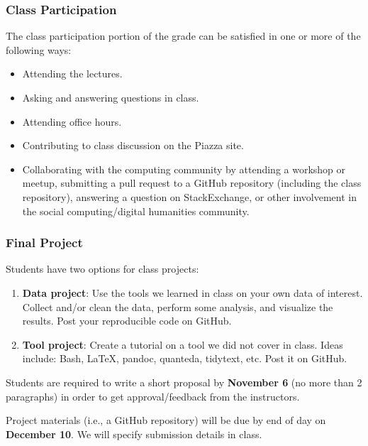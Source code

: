 \documentclass[]{book}
\providecommand{\tightlist}{%
  \setlength{\itemsep}{0pt}\setlength{\parskip}{0pt}}
\begin{document}
\subsubsection*{Class Participation}\label{class-participation}

The class participation portion of the grade can be satisfied in one or
more of the following ways:

\begin{itemize}
\tightlist
\item
  Attending the lectures.
\item
  Asking and answering questions in class.
\item
  Attending office hours.
\item
  Contributing to class discussion on the Piazza site.
\item
  Collaborating with the computing community by attending a workshop or
  meetup, submitting a pull request to a GitHub repository (including
  the class repository), answering a question on StackExchange, or other
  involvement in the social computing/digital humanities community.
\end{itemize}

\subsubsection*{Final Project}\label{final-project}

Students have two options for class projects:

\begin{enumerate}
\def\labelenumi{\arabic{enumi}.}
\item
  \textbf{Data project}: Use the tools we learned in class on your own
  data of interest. Collect and/or clean the data, perform some
  analysis, and visualize the results. Post your reproducible code on
  GitHub.
\item
  \textbf{Tool project}: Create a tutorial on a tool we did not cover in
  class. Ideas include: Bash, LaTeX, pandoc, quanteda, tidytext, etc.
  Post it on GitHub.
\end{enumerate}

Students are required to write a short proposal by \textbf{November 6}
(no more than 2 paragraphs) in order to get approval/feedback from the
instructors.

Project materials (i.e., a GitHub repository) will be due by end of day
on \textbf{December 10}. We will specify submission details in class.
\end{document}
